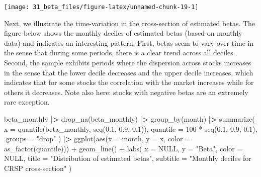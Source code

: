 \documentclass[
]{book}
\newenvironment{Shaded}{\begin{snugshade}}{\end{snugshade}}
\newcommand{\AttributeTok}[1]{\textcolor[rgb]{0.61,0.61,0.61}{#1}}
\newcommand{\ConstantTok}[1]{\textcolor[rgb]{0,0,0}{#1}}
\newcommand{\DecValTok}[1]{\textcolor[rgb]{0.06,0.06,0.06}{#1}}
\newcommand{\ErrorTok}[1]{\textcolor[rgb]{0.14,0.14,0.14}{\textbf{#1}}}
\newcommand{\FloatTok}[1]{\textcolor[rgb]{0.06,0.06,0.06}{#1}}
\newcommand{\FunctionTok}[1]{\textcolor[rgb]{0,0,0}{#1}}
\newcommand{\NormalTok}[1]{#1}
\newcommand{\SpecialCharTok}[1]{\textcolor[rgb]{0,0,0}{#1}}
\newcommand{\StringTok}[1]{\textcolor[rgb]{0.5,0.5,0.5}{#1}}
\begin{document}
\begin{center}\texttt{[image: 31\_beta\_files/figure-latex/unnamed-chunk-19-1]} \end{center}

Next, we illustrate the time-variation in the cross-section of estimated betas. The figure below shows the monthly deciles of estimated betas (based on monthly data) and indicates an interesting pattern: First, betas seem to vary over time in the sense that during some periods, there is a clear trend across all deciles. Second, the sample exhibits periods where the dispersion across stocks increases in the sense that the lower decile decreases and the upper decile increases, which indicates that for some stocks the correlation with the market increases while for others it decreases. Note also here: stocks with negative betas are an extremely rare exception.

\begin{Shaded}
\begin{Highlighting}[]
\NormalTok{beta\_monthly }\SpecialCharTok{|}\ErrorTok{\textgreater{}}
  \FunctionTok{drop\_na}\NormalTok{(beta\_monthly) }\SpecialCharTok{|}\ErrorTok{\textgreater{}}
  \FunctionTok{group\_by}\NormalTok{(month) }\SpecialCharTok{|}\ErrorTok{\textgreater{}}
  \FunctionTok{summarize}\NormalTok{(}
    \AttributeTok{x =} \FunctionTok{quantile}\NormalTok{(beta\_monthly, }\FunctionTok{seq}\NormalTok{(}\FloatTok{0.1}\NormalTok{, }\FloatTok{0.9}\NormalTok{, }\FloatTok{0.1}\NormalTok{)),}
    \AttributeTok{quantile =} \DecValTok{100} \SpecialCharTok{*} \FunctionTok{seq}\NormalTok{(}\FloatTok{0.1}\NormalTok{, }\FloatTok{0.9}\NormalTok{, }\FloatTok{0.1}\NormalTok{),}
    \AttributeTok{.groups =} \StringTok{"drop"}
\NormalTok{  ) }\SpecialCharTok{|}\ErrorTok{\textgreater{}}
  \FunctionTok{ggplot}\NormalTok{(}\FunctionTok{aes}\NormalTok{(}\AttributeTok{x =}\NormalTok{ month, }\AttributeTok{y =}\NormalTok{ x, }\AttributeTok{color =} \FunctionTok{as\_factor}\NormalTok{(quantile))) }\SpecialCharTok{+}
  \FunctionTok{geom\_line}\NormalTok{() }\SpecialCharTok{+}
  \FunctionTok{labs}\NormalTok{(}
    \AttributeTok{x =} \ConstantTok{NULL}\NormalTok{, }\AttributeTok{y =} \StringTok{"Beta"}\NormalTok{, }\AttributeTok{color =} \ConstantTok{NULL}\NormalTok{,}
    \AttributeTok{title =} \StringTok{"Distribution of estimated betas"}\NormalTok{,}
    \AttributeTok{subtitle =} \StringTok{"Monthly deciles for CRSP cross{-}section"}
\NormalTok{  )}
\end{Highlighting}
\end{Shaded}
\end{document}
